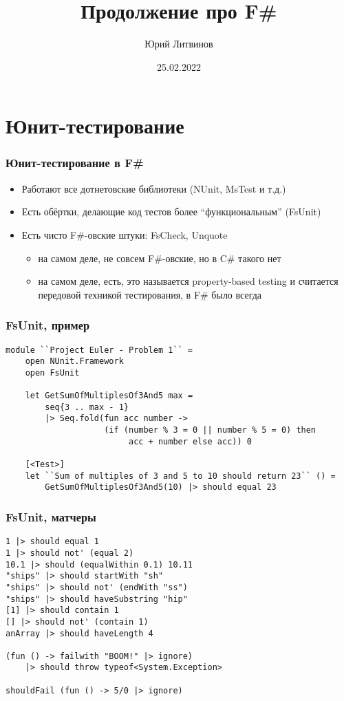 \documentclass[xetex,mathserif,serif]{beamer}
\title{Продолжение про F\#}
\author{Юрий Литвинов}
\date{25.02.2022}
\begin{document}
    
    \frame{\titlepage}

    \section{Юнит-тестирование}

    \begin{frame}
        \frametitle{Юнит-тестирование в F\#}
        \begin{itemize}
            \item Работают все дотнетовские библиотеки (NUnit, MsTest и т.д.)
            \item Есть обёртки, делающие код тестов более ``функциональным'' (FsUnit)
            \item Есть чисто F\#-овские штуки: FsCheck, Unquote 
            \begin{itemize}
                \item на самом деле, не совсем F\#-овские, но в C\# такого нет
                \item на самом деле, есть, это называется property-based testing и считается передовой техникой тестирования, в F\# было всегда
            \end{itemize}
        \end{itemize}
    \end{frame}

    \begin{frame}[fragile]
        \frametitle{FsUnit, пример}
        \begin{verbatim}
module ``Project Euler - Problem 1`` =
    open NUnit.Framework
    open FsUnit

    let GetSumOfMultiplesOf3And5 max =
        seq{3 .. max - 1} 
        |> Seq.fold(fun acc number ->
                    (if (number % 3 = 0 || number % 5 = 0) then
                         acc + number else acc)) 0

    [<Test>]
    let ``Sum of multiples of 3 and 5 to 10 should return 23`` () =
        GetSumOfMultiplesOf3And5(10) |> should equal 23
        \end{verbatim}
    \end{frame}

    \begin{frame}[fragile]
        \frametitle{FsUnit, матчеры}
        \begin{verbatim}
1 |> should equal 1
1 |> should not' (equal 2)
10.1 |> should (equalWithin 0.1) 10.11
"ships" |> should startWith "sh"
"ships" |> should not' (endWith "ss")
"ships" |> should haveSubstring "hip"
[1] |> should contain 1
[] |> should not' (contain 1)
anArray |> should haveLength 4

(fun () -> failwith "BOOM!" |> ignore) 
    |> should throw typeof<System.Exception>

shouldFail (fun () -> 5/0 |> ignore)
        \end{verbatim}
    \end{frame}
\end{document}
